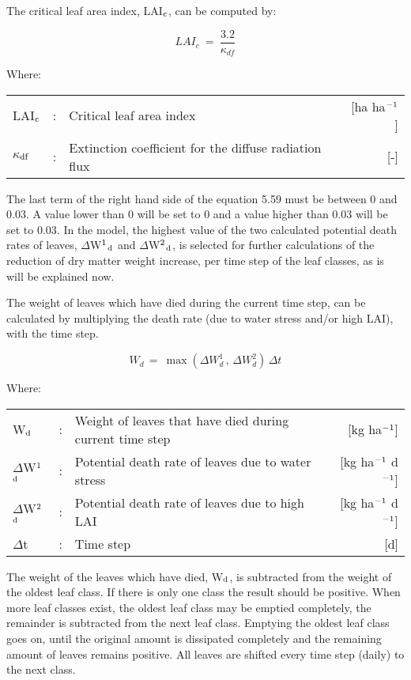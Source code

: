 The critical leaf area index, LAI$_{{\rm c}}$,  can be computed by:

\begin{equation}
LAI _{c} ~=~{\frac{3.2}{\kappa  _{df} }}
\end{equation}

Where:\\
\begin{tabularx}{\textwidth}{llXr}
LAI$_{{\rm c}}$ &:& Critical leaf area index    &    [ha ha$^{{\rm -1}}$]\\
$\kappa$$_{{\rm df}}$ &:& Extinction coefficient for 
    the diffuse radiation flux   &    [-]\\
\end{tabularx}

The last term of the right hand side of the equation 5.59 must be between 0 and 0.03. A 
value lower than 0 will be set to 0 and a value higher than 0.03 will be set to 0.03. In the
model, the highest value of the two calculated potential death rates of leaves, 
$\Delta$W$^{{\rm 1}}$$_{{\rm d}}$ and $\Delta$W$^{{\rm 2}}$$_{{\rm d}}$, is selected 
for further calculations of the reduction of dry matter weight increase,
per time step of the leaf classes, as is will be explained now. 

The weight of leaves which have died during the current time step, can be calculated by
multiplying the death rate (due to water stress and/or high LAI), with the time step.

\begin{equation}
W _{d~} =~ \max (\Delta W _{d}^{1} \, ,\,\Delta W _{d}^{2} )\,\Delta t
\end{equation}

Where:\\
\begin{tabularx}{\textwidth}{llXr}
W$_{{\rm d}}$ &:& Weight of leaves that have died during 
    current time step    &    [kg ha$^{{\rm -1}}$]\\
$\Delta$W$^{{\rm 1}}$$_{{\rm d}}$ &:& Potential death rate of leaves due 
    to water stress   &      [kg ha$^{{\rm -1}}$ d$^{{\rm -1}}$]\\
$\Delta$W$^{{\rm 2}}$$_{{\rm d}}$ &:& Potential death rate of leaves due to 
    high LAI   &     [kg ha$^{{\rm -1}}$ d$^{{\rm -1}}$]\\
$\Delta$t &:& Time step    &    [d]\\
\end{tabularx}

The weight of the leaves which have died, W$_{{\rm d}}$, is subtracted from the weight of the oldest
leaf class. If there is only one class the result should be positive. When more leaf classes
exist, the oldest leaf class may be emptied completely, the remainder is subtracted from
the next leaf class. Emptying the oldest leaf class goes on, until the original amount is
dissipated complete\-ly and the remaining amount of leaves remains positive. All leaves are
shifted every time step (daily) to the next class.

